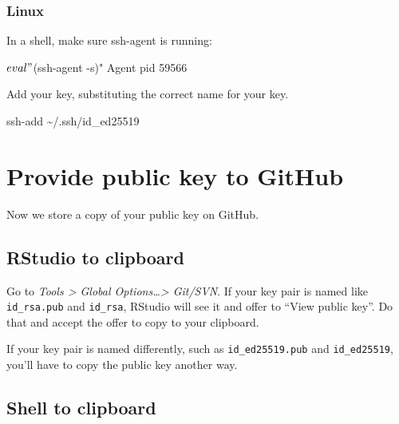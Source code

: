 \documentclass[
]{book}
\newenvironment{Shaded}{\begin{snugshade}}{\end{snugshade}}
\newcommand{\NormalTok}[1]{#1}
\begin{document}
\begin{Shaded}
\end{Shaded}

\subsubsection{Linux}\label{linux-1}

In a shell, make sure ssh-agent is running:

\begin{Shaded}
\begin{Highlighting}[]
\NormalTok{$ eval "$(ssh{-}agent {-}s)"}
\NormalTok{Agent pid 59566}
\end{Highlighting}
\end{Shaded}

Add your key, substituting the correct name for your key.

\begin{Shaded}
\begin{Highlighting}[]
\NormalTok{ssh{-}add \textasciitilde{}/.ssh/id\_ed25519}
\end{Highlighting}
\end{Shaded}

\section{Provide public key to GitHub}\label{provide-public-key-to-github}

Now we store a copy of your public key on GitHub.

\subsection{RStudio to clipboard}\label{rstudio-to-clipboard}

Go to \emph{Tools \textgreater{} Global Options\ldots\textgreater{} Git/SVN}.
If your key pair is named like \texttt{id\_rsa.pub} and \texttt{id\_rsa}, RStudio will see it and offer to ``View public key''.
Do that and accept the offer to copy to your clipboard.

If your key pair is named differently, such as \texttt{id\_ed25519.pub} and \texttt{id\_ed25519}, you'll have to copy the public key another way.

\subsection{Shell to clipboard}\label{shell-to-clipboard}
\end{document}
